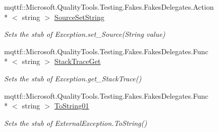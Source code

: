 \begin{DoxyCompactItemize}
mqttf\-::\-Microsoft.\-Quality\-Tools.\-Testing.\-Fakes.\-Fakes\-Delegates.\-Action\\*
$<$ string $>$ \hyperlink{class_system_1_1_net_1_1_network_information_1_1_fakes_1_1_stub_network_information_exception_acef03bf11930d3e0e4717d713da34ae1}{Source\-Set\-String}
\begin{DoxyCompactList}\small\item\em Sets the stub of Exception.\-set\-\_\-\-Source(\-String value)\end{DoxyCompactList}\item 
mqttf\-::\-Microsoft.\-Quality\-Tools.\-Testing.\-Fakes.\-Fakes\-Delegates.\-Func\\*
$<$ string $>$ \hyperlink{class_system_1_1_net_1_1_network_information_1_1_fakes_1_1_stub_network_information_exception_ab5cfb913ed8e5cc35ec40275e41b20dc}{Stack\-Trace\-Get}
\begin{DoxyCompactList}\small\item\em Sets the stub of Exception.\-get\-\_\-\-Stack\-Trace()\end{DoxyCompactList}\item 
mqttf\-::\-Microsoft.\-Quality\-Tools.\-Testing.\-Fakes.\-Fakes\-Delegates.\-Func\\*
$<$ string $>$ \hyperlink{class_system_1_1_net_1_1_network_information_1_1_fakes_1_1_stub_network_information_exception_ab90a2c5170db01f138560114d64067da}{To\-String01}
\begin{DoxyCompactList}\small\item\em Sets the stub of External\-Exception.\-To\-String()\end{DoxyCompactList}\end{DoxyCompactItemize}
